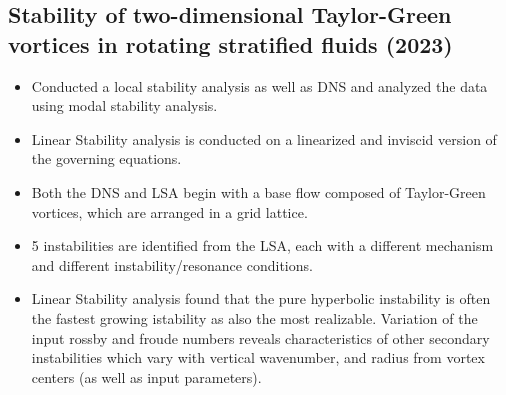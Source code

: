 \documentclass{article}
\begin{document}
    \subsection{Stability of two-dimensional Taylor-Green vortices in rotating
    stratified fluids (2023)}
    \begin{itemize}
        \item Conducted a local stability analysis as well as DNS and analyzed the
        data using modal stability analysis. 
        \item Linear Stability analysis is conducted on a linearized and inviscid
        version of the governing equations.
        \item Both the DNS and LSA begin with a base flow composed of Taylor-Green
        vortices, which are arranged in a grid lattice. 
        \item 5 instabilities are identified from the LSA, each with a different
        mechanism and different instability/resonance conditions. 
        \item Linear Stability analysis found that the pure hyperbolic instability
        is often the fastest growing istability as also the most realizable.
        Variation of the input rossby and froude numbers reveals characteristics of
        other secondary instabilities which vary with vertical wavenumber, and
        radius from vortex centers (as well as input parameters). 
    \end{itemize}
\end{document}
